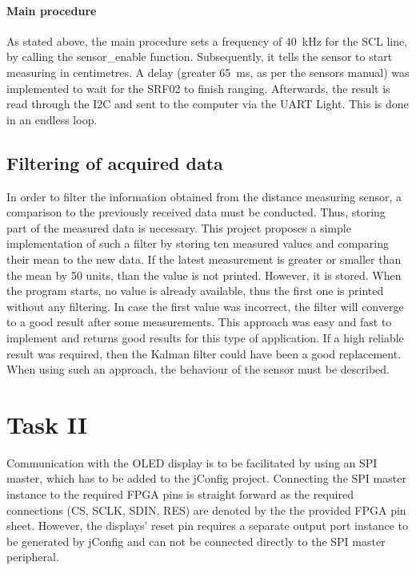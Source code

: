 			\paragraph{Main procedure} %
	   		\label{par:data_read_task1}
	   			As stated above, the main procedure sets a frequency of \SI{40}{\kilo\hertz} for the SCL line, by calling the sensor\_enable function. Subsequently, it tells the sensor to start measuring in centimetres. A delay (greater \SI{65}{\milli\second}, as per the sensors manual) was implemented to wait for the SRF02 to finish ranging. Afterwards, the result is read through the I2C and sent to the computer via the UART Light. This is done in an endless loop.

		\subsection{Filtering of acquired data} %
		\label{sub:filter}
			In order to filter the information obtained from the distance measuring sensor, a comparison to the previously received data must be conducted. Thus, storing part of the measured data is necessary.
			This project proposes a simple implementation of such a filter by storing ten measured values and comparing their mean to the new data. If the latest measurement is greater or smaller than the mean by 50 units, than the value is not printed. However, it is stored. When the program starts, no value is already available, thus the first one is printed without any filtering. In case the first value was incorrect, the filter will converge to a good result after some measurements.
			This approach was easy and fast to implement and returns good results for this type of application. If a high reliable result was required, then the Kalman filter could have been a good replacement. When using such an approach, the behaviour of the sensor must be described.

	\section{Task II} %
	\label{sec:impl_task_2}
		Communication with the OLED display is to be facilitated by using an SPI master, which has to be added to the jConfig project. Connecting the SPI master instance to the required FPGA pins is straight forward as the required connections (CS, SCLK, SDIN, RES) are denoted by the the provided FPGA pin sheet. However, the displays' reset pin requires a separate output port instance to be generated by jConfig and can not be connected directly to the SPI master peripheral. 

